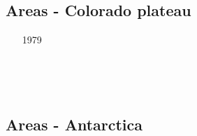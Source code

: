 \subsection{Areas - Colorado plateau}

\begin{scriptsize}
\begin{itemize}
\item[1979]
\textcite{bird79} \\
\item[\twothousandten]
\textcite{vabv10} \\
\item[\twothousandeleven]
\textcite{lesm11} \\
\end{itemize}
\end{scriptsize}


\subsection{Areas - Antarctica}

\begin{scriptsize}
\begin{itemize}
\item[\nineteenninetyeight]
\textcite{gumm98} \\
\item[\twothousandseven]
\textcite{huha07} \\
\item[\twothousandten]
\textcite{spgs10a} \\
\item[\twothousandtwelve]
\textcite{whbl12} \\
\textcite{pode12} \\
\item[\twothousandthirteen]
\textcite{awzh13} \\
\textcite{ivjw13} \\
\item[\twothousandfifteen]
\textcite{aupm15} \\
\item[\twothousandeighteen]
\textcite{mimr18} \\
\item[\twothousandtwentyone]
\textcite{brst21} \\
\end{itemize}
\end{scriptsize}

